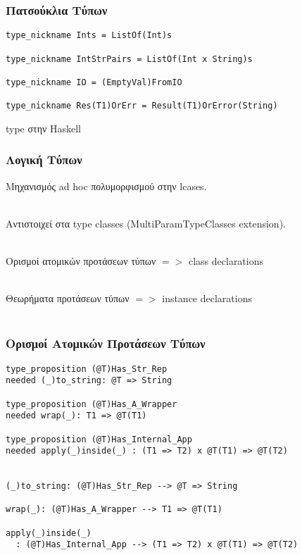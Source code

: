 \documentclass{beamer}
\def\e{\foreignlanguage{english}}
\def\h{\e{Haskell}}
\begin{document}
\begin{frame}[fragile]

\frametitle{Πατσούκλια Τύπων}

\begin{otherlanguage}{english}
\begin{verbatim}
type_nickname Ints = ListOf(Int)s

type_nickname IntStrPairs = ListOf(Int x String)s

type_nickname IO = (EmptyVal)FromIO

type_nickname Res(T1)OrErr = Result(T1)OrError(String)

\end{verbatim}
\end{otherlanguage}

\e{type} στην \h

\end{frame}

\begin{frame}

\frametitle{Λογική Τύπων}

Μηχανισμός \e{ad hoc} πολυμορφισμού στην \e{lcases}.
\\~\

Αντιστοιχεί στα \e{type classes (MultiParamTypeClasses extension)}.
\\~\

Ορισμοί ατομικών προτάσεων τύπων $ => $ \e{class declarations}
\\~\

Θεωρήματα προτάσεων τύπων $ => $ \e{instance declarations}
\\~\

\end{frame}

\begin{frame}[fragile]

\frametitle{Ορισμοί Ατομικών Προτάσεων Τύπων}

\begin{otherlanguage}{english}
\begin{verbatim}
type_proposition (@T)Has_Str_Rep
needed (_)to_string: @T => String

type_proposition (@T)Has_A_Wrapper
needed wrap(_): T1 => @T(T1)

type_proposition (@T)Has_Internal_App
needed apply(_)inside(_) : (T1 => T2) x @T(T1) => @T(T2)


(_)to_string: (@T)Has_Str_Rep --> @T => String

wrap(_): (@T)Has_A_Wrapper --> T1 => @T(T1)

apply(_)inside(_)
  : (@T)Has_Internal_App --> (T1 => T2) x @T(T1) => @T(T2)
\end{verbatim}
\end{otherlanguage}

\end{frame}
\end{document}
